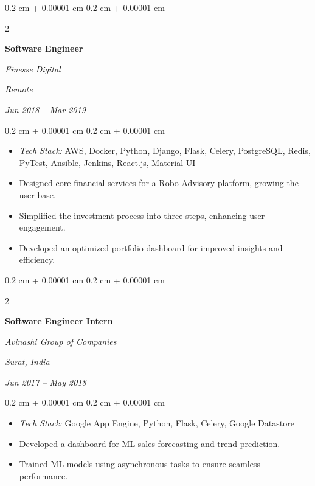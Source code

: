 \documentclass[10pt, letterpaper]{article}
\newenvironment{highlights}{
        \begin{itemize}[
            topsep=0.10 cm,
            parsep=0.10 cm,
            partopsep=0pt,
            itemsep=0pt,
            leftmargin=0.4 cm + 10pt
        ]
    }{
        \end{itemize}
    } %
\newenvironment{onecolentry}{
        \begin{adjustwidth}{
            0.2 cm + 0.00001 cm
        }{
            0.2 cm + 0.00001 cm
        }
    }{
        \end{adjustwidth}
    } %
\newenvironment{twocolentry}[2][]{
        \onecolentry
        \def\secondColumn{#2}
        \setcolumnwidth{\fill, 4.5 cm}
        \begin{paracol}{2}
    }{
        \switchcolumn \raggedleft \secondColumn
        \end{paracol}
        \endonecolentry
    } %
\begin{document}
        \vspace{0.2 cm}

        \begin{twocolentry}{
        \textit{Remote}    
            
        \textit{Jun 2018 – Mar 2019}}
            \textbf{Software Engineer}
            
            \textit{Finesse Digital}
        \end{twocolentry}

        \vspace{0.10 cm}
        \begin{onecolentry}
            \begin{highlights}
                \item \textit{Tech Stack:} AWS, Docker, Python, Django, Flask, Celery, PostgreSQL, Redis, PyTest, Ansible, Jenkins, React.js, Material UI
                \item Designed core financial services for a Robo-Advisory platform, growing the user base.
                \item Simplified the investment process into three steps, enhancing user engagement.
                \item Developed an optimized portfolio dashboard for improved insights and efficiency.
            \end{highlights}
        \end{onecolentry}

        \vspace{0.2 cm}

        \begin{twocolentry}{
        \textit{Surat, India}    
            
        \textit{Jun 2017 – May 2018}}
            \textbf{Software Engineer Intern}
            
            \textit{Avinashi Group of Companies}
        \end{twocolentry}

        \vspace{0.10 cm}
        \begin{onecolentry}
            \begin{highlights}
                \item \textit{Tech Stack:} Google App Engine, Python, Flask, Celery, Google Datastore
                \item Developed a dashboard for ML sales forecasting and trend prediction.
                \item Trained ML models using asynchronous tasks to ensure seamless performance.
            \end{highlights}
        \end{onecolentry}
\end{document}
